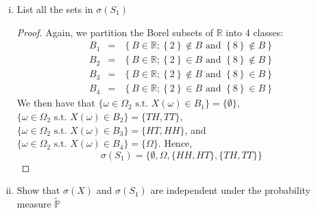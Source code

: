 \documentclass{article}
\newcommand{\p}{\mathbb{P}}
\newcommand{\R}{\mathbb{R}}
\newcommand{\tp}{\tilde{\p}}
\newcommand{\st}{\text{ s.t. }}
\newcommand{\seq}[1]{\{ #1 \}}
\theoremstyle{definition}
\theoremstyle{definition}
\begin{document}
\begin{enumerate}
\begin{enumerate}[(i)]
    \item List all the sets in $\sigma(S_1)$
    \begin{proof}
    Again, we partition the Borel subsets of $\R$ into 4 classes:
    \begin{eqnarray*}
B_{1} &=&\left\{ B\in \mathbb{R};\left\{ 2\right\} \notin B\text{ and }%
\left\{ 8\right\} \notin B\right\}  \\
B_{2} &=&\left\{ B\in \mathbb{R};\left\{ 2\right\} \in B\text{ and }\left\{
8\right\} \notin B\right\}  \\
B_{3} &=&\left\{ B\in \mathbb{R};\left\{ 2\right\} \notin B\text{ and }%
\left\{ 8\right\} \in B\right\}  \\
B_{4} &=&\left\{ B\in \mathbb{R};\left\{ 2\right\} \in B\text{ and }\left\{
8\right\} \in B\right\} 
\end{eqnarray*}
We then have that $\seq{\omega \in \Omega_2 \st X(\omega) \in B_1} = \seq{\emptyset}$, $\seq{\omega \in \Omega_2 \st X(\omega) \in B_2} = \seq{TH,TT}$, $\seq{\omega \in \Omega_2 \st X(\omega) \in B_3} = \seq{HT,HH}$, and $\seq{\omega \in \Omega_2 \st X(\omega) \in B_4} = \seq{\Omega}$. Hence,
        $$\sigma(S_1) = \seq{\emptyset,\Omega,\seq{HH,HT},\seq{TH,TT}}$$
    \end{proof}
    
    \item Show that $\sigma(X)$ and $\sigma(S_1)$ are independent under the probability measure $\tp$
    

\end{enumerate}
\end{enumerate}
\end{document}
